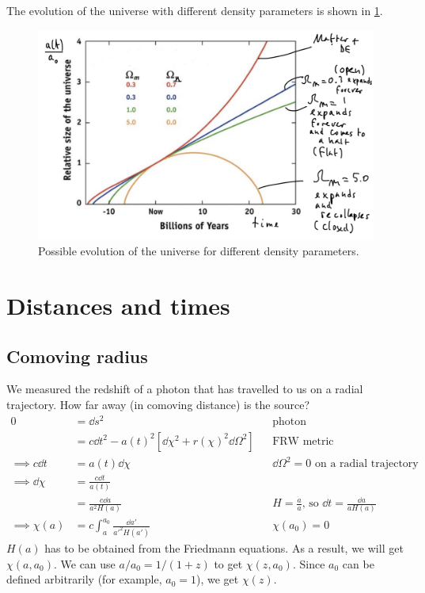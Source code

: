 The evolution of the universe with different density parameters is shown in \cref{fig:evolution}.

\begin{figure}
	\centering
	\includegraphics[width=\textwidth]{img/ch-02/evolution.png}
	\caption{Possible evolution of the universe for different density parameters.}
	\label{fig:evolution}
\end{figure}




\section{Distances and times}

\subsection{Comoving radius}
We measured the redshift of a photon that has travelled to us on a radial trajectory. How far away (in comoving distance) is the source?
\begin{align*}
	0 &= \dd{s}^2 &&\text{photon}\\
	&= c \dd{t}^2 - a(t)^2 [\dd{\chi}^2 + r(\chi)^2 \dd{\Omega}^2] &&\text{FRW metric}\\
	\implies c \dd{t} &= a(t) \dd{\chi} &&\dd{\Omega}^2 = 0 \text{ on a radial trajectory}\\
	\implies \dd{\chi} &= \frac{c \dd{t}}{a(t)}\\
	&= \frac{c \dd{a}}{a^2 H(a)} && H = \frac{\dot{a}}{a} \text{, so } \dd{t} = \frac{\dd{a}}{a H(a)}\\
	\implies \chi(a) &= c \int_a^{a_0} \frac{\dd{a'}}{a'^2 H(a')} && \chi(a_0) = 0
\end{align*}
$H(a)$ has to be obtained from the Friedmann equations. As a result, we will get $\chi(a,a_0)$. We can use $a/a_0 = 1/(1+z)$ to get $\chi(z,a_0)$. Since $a_0$ can be defined arbitrarily (for example, $a_0=1$), we get $\chi(z)$.

